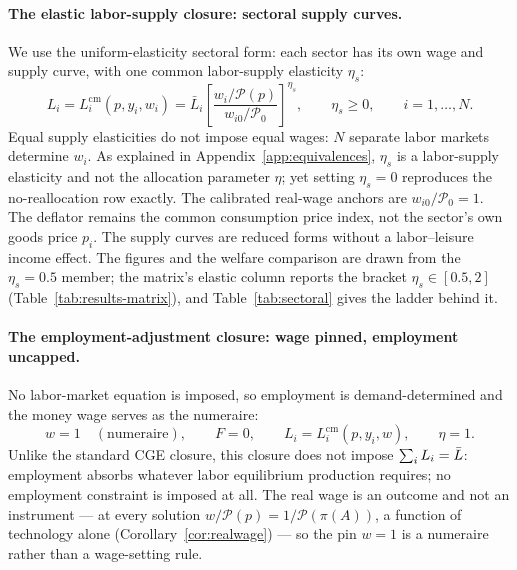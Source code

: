 \paragraph{The elastic labor-supply closure: sectoral supply curves.}
We use the uniform-elasticity sectoral form: each sector has its own wage
and supply curve, with one common labor-supply elasticity $\eta_s$:
\begin{equation}
L_i = L_i^{\mathrm{cm}}(p,y_i,w_i)
 = \bar{L}_i \left[\frac{w_i/\mathcal{P}(p)}{w_{i0}/\mathcal{P}_0}\right]^{\eta_s},
\qquad \eta_s \geq 0, \qquad i=1,\ldots,N.
\label{eq:closure-beta}
\end{equation}
Equal supply elasticities do not impose equal wages: $N$ separate labor
markets determine $w_i$. As explained in Appendix~\ref{app:equivalences}, $\eta_s$ is a labor-supply
elasticity and not the allocation parameter $\eta$; yet setting $\eta_s = 0$
reproduces the no-reallocation row exactly. The calibrated real-wage anchors are $w_{i0}/\mathcal{P}_0 = 1$. The deflator remains the common consumption price index, not the sector's own goods price $p_i$. The supply curves are reduced forms without a
labor--leisure income effect. The figures and the welfare comparison are drawn from the $\eta_s = 0.5$
member; the matrix's elastic column reports the bracket $\eta_s \in [0.5, 2]$
(Table~\ref{tab:results-matrix}), and Table~\ref{tab:sectoral} gives the ladder
behind it. 

\paragraph{The employment-adjustment closure: wage pinned, employment uncapped.}
No labor-market equation is imposed, so employment is demand-determined and the
money wage serves as the numeraire:
\begin{equation}
w = 1 \quad(\text{numeraire}),
\qquad F = 0,
\qquad L_i = L_i^{\mathrm{cm}}(p,y_i,w),
\qquad \eta = 1 .
\label{eq:closure-gamma}
\end{equation}
Unlike the standard CGE closure, this closure does not impose
$\sum_i L_i = \bar{L}$: employment absorbs whatever labor equilibrium
production requires; no employment constraint is imposed at all. The real
wage is an outcome and not an instrument --- at every solution
$w/\mathcal{P}(p) = 1/\mathcal{P}(\pi(A))$, a function of technology alone
(Corollary~\ref{cor:realwage}) --- so the pin $w=1$ is a numeraire rather than a
wage-setting rule. 

